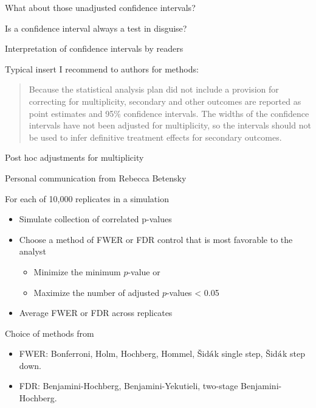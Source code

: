 \documentclass[ignorenonframetext,]{beamer}
\providecommand{\tightlist}{%
  \setlength{\itemsep}{0pt}\setlength{\parskip}{0pt}}
\begin{document}
\begin{frame}{What about those unadjusted confidence intervals?}
\protect\hypertarget{what-about-those-unadjusted-confidence-intervals}{}

Is a confidence interval always a test in disguise?

Interpretation of confidence intervals by readers

Typical insert I recommend to authors for methods:

\begin{quote}
Because the statistical analysis plan did not include a provision for correcting for multiplicity, secondary and other outcomes are reported as point estimates and 95\% confidence intervals. The widths of the confidence intervals have not been adjusted for multiplicity, so the intervals should not be used to infer definitive treatment effects for secondary outcomes.

\end{quote}

\end{frame}

\begin{frame}{Post hoc adjustments for multiplicity}
\protect\hypertarget{post-hoc-adjustments-for-multiplicity}{}

\small

Personal communication from Rebecca Betensky

For each of 10,000 replicates in a simulation

\begin{itemize}
\item
  Simulate collection of correlated p-values\\
\item
  Choose a method of FWER or FDR control that is most favorable to the
  analyst

  \begin{itemize}
  \tightlist
  \item
    Minimize the minimum \(p\)-value or\\
  \item
    Maximize the number of adjusted \(p\)-values \textless{} 0.05
  \end{itemize}
\item
  Average FWER or FDR across replicates
\end{itemize}

Choice of methods from

\begin{itemize}
\item
  FWER: Bonferroni, Holm, Hochberg, Hommel,
  \v{S}id\(\acute{\textrm a}\)k single step,
  \v{S}id\(\acute{\textrm a}\)k step down.
\item
  FDR: Benjamini-Hochberg, Benjamini-Yekutieli, two-stage
  Benjamini-Hochberg.
\end{itemize}

\end{frame}
\end{document}
